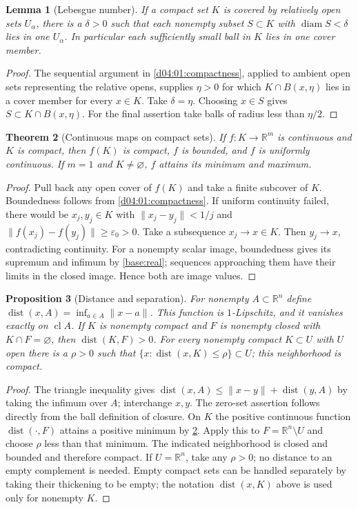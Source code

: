 \documentclass[11pt,oneside,openany]{book}
\newtheorem{theorem}{Theorem}[chapter]
\newtheorem{lemma}[theorem]{Lemma}
\newtheorem{proposition}[theorem]{Proposition}
\theoremstyle{definition}
\theoremstyle{remark}
\newcommand{\R}{\mathbb R}
\newcommand{\eps}{\varepsilon}
\newcommand{\norm}[1]{\lVert#1\rVert}
\DeclareMathOperator{\dist}{dist}
\DeclareMathOperator{\diam}{diam}
\DeclareMathOperator{\cl}{cl}
\begin{document}
\begin{lemma}[Lebesgue number]\label{d04:01:lebesgue-number}
If a compact set $K$ is covered by relatively open sets $U_\alpha$, there
is a $\delta>0$ such that each nonempty subset $S\subset K$ with
$\diam S<\delta$ lies in one $U_\alpha$. In particular each sufficiently
small ball in $K$ lies in one cover member.
\end{lemma}
\begin{proof}
The sequential argument in \cref{d04:01:compactness}, applied to ambient open
sets representing the relative opens, supplies $\eta>0$ for which
$K\cap B(x,\eta)$ lies in a cover member for every $x\in K$. Take
$\delta=\eta$. Choosing $x\in S$ gives $S\subset K\cap B(x,\eta)$.
For the final assertion take balls of radius less than $\eta/2$.
\end{proof}

\begin{theorem}[Continuous maps on compact sets]\label{d04:01:compact-continuity}
If $f:K\to\R^m$ is continuous and $K$ is compact, then $f(K)$ is compact,
$f$ is bounded, and $f$ is uniformly continuous. If $m=1$ and $K\ne\varnothing$,
$f$ attains its minimum and maximum.
\end{theorem}
\begin{proof}
Pull back any open cover of $f(K)$ and take a finite subcover of $K$.
Boundedness follows from \cref{d04:01:compactness}. If uniform continuity
failed, there would be $x_j,y_j\in K$ with
$\norm{x_j-y_j}<1/j$ and $\norm{f(x_j)-f(y_j)}\geq\eps_0>0$.
Take a subsequence $x_j\to x\in K$. Then $y_j\to x$, contradicting
continuity. For a nonempty scalar image, boundedness gives its supremum and
infimum by \cref{base:real}; sequences approaching them have their limits
in the closed image. Hence both are image values.
\end{proof}

\begin{proposition}[Distance and separation]\label{d04:01:distance}
For nonempty $A\subset\R^n$ define
$\dist(x,A)=\inf_{a\in A}\norm{x-a}$. This function is $1$-Lipschitz,
and it vanishes exactly on $\cl A$. If $K$ is nonempty compact and $F$ is
nonempty closed with $K\cap F=\varnothing$, then $\dist(K,F)>0$.
For every nonempty compact $K\subset U$ with $U$ open there is a $\rho>0$ such that
$\{x:\dist(x,K)\leq\rho\}\subset U$; this neighborhood is compact.
\end{proposition}
\begin{proof}
The triangle inequality gives
$\dist(x,A)\leq\norm{x-y}+\dist(y,A)$ by taking the infimum over
$A$; interchange $x,y$. The zero-set assertion follows directly from the
ball definition of closure. On $K$ the positive continuous function
$\dist(\cdot,F)$ attains a positive minimum by
\cref{d04:01:compact-continuity}. Apply this to $F=\R^n\setminus U$
and choose $\rho$ less than that minimum. The indicated neighborhood is
closed and bounded and therefore compact. If $U=\R^n$, take any $\rho>0$;
no distance to an empty complement is needed. Empty compact sets can be
handled separately by taking their thickening to be empty; the notation
$\dist(x,K)$ above is used only for nonempty $K$.
\end{proof}
\end{document}
